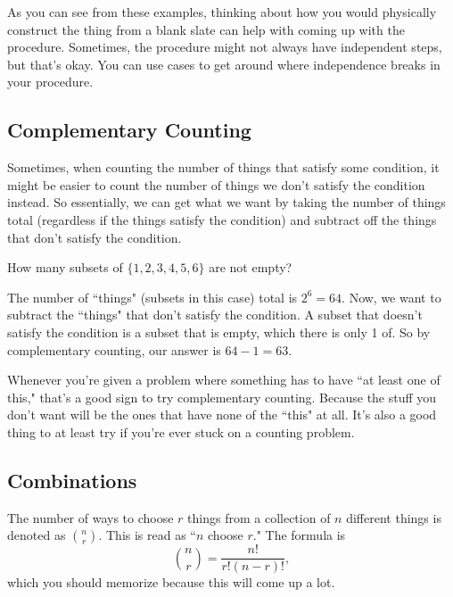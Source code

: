 \documentclass[11pt]{scrartcl}
\begin{document}
\begin{advice}
    As you can see from these examples, thinking about how you would physically construct the thing from a blank slate can help with coming up with the procedure. Sometimes, the procedure might not always have independent steps, but that's okay. You can use cases to get around where independence breaks in your procedure.
\end{advice}

\subsection{Complementary Counting}

Sometimes, when counting the number of things that satisfy some condition, it might be easier to count the number of things we don't satisfy the condition instead. So essentially, we can get what we want by taking the number of things total (regardless if the things satisfy the condition) and subtract off the things that don't satisfy the condition.

\begin{example}
    How many subsets of $\{1, 2, 3, 4, 5, 6\}$ are not empty?
\end{example}
The number of ``things" (subsets in this case) total is $2^6 = 64$. Now, we want to subtract the ``things" that don't satisfy the condition. A subset that doesn't satisfy the condition is a subset that is empty, which there is only 1 of. So by complementary counting, our answer is $64 - 1 = 63$.

\begin{advice}
    Whenever you're given a problem where something has to have ``at least one of this," that's a good sign to try complementary counting. Because the stuff you don't want will be the ones that have none of the ``this" at all. It's also a good thing to at least try if you're ever stuck on a counting problem.
\end{advice}

\subsection{Combinations}

The number of ways to choose $r$ things from a collection of $n$ different things is denoted as $\binom{n}{r}$. This is read as ``$n$ choose $r$." The formula is \[\binom{n}{r} = \frac{n!}{r!(n-r)!},\] which you should memorize because this will come up a lot.
\end{document}
